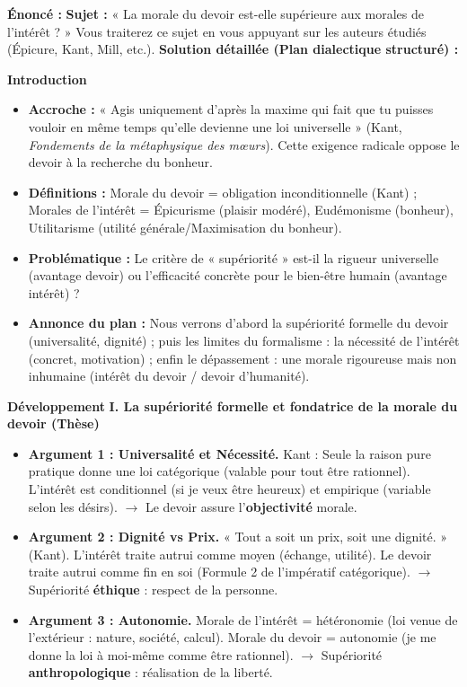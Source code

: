 \documentclass[11pt]{article}
\newcommand{\cle}[1]{{\popxbold\color{popdark}#1}}
\begin{document}
\begin{exoresolu}
\textbf{Énoncé :} \textbf{Sujet :} « La morale du devoir est-elle supérieure aux morales de l'intérêt ? » Vous traiterez ce sujet en vous appuyant sur les auteurs étudiés (Épicure, Kant, Mill, etc.).
\tcblower
\textbf{Solution détaillée (Plan dialectique structuré) :}

\textbf{Introduction}
\begin{itemize}
    \item \textbf{Accroche :} « Agis uniquement d'après la maxime qui fait que tu puisses vouloir en même temps qu'elle devienne une loi universelle » (Kant, \emph{Fondements de la métaphysique des mœurs}). Cette exigence radicale oppose le devoir à la recherche du bonheur.
    \item \textbf{Définitions :} Morale du devoir = obligation inconditionnelle (Kant) ; Morales de l'intérêt = Épicurisme (plaisir modéré), Eudémonisme (bonheur), Utilitarisme (utilité générale/Maximisation du bonheur).
    \item \textbf{Problématique :} Le critère de « supériorité » est-il la \cle{rigueur universelle} (avantage devoir) ou l'\cle{efficacité concrète} pour le bien-être humain (avantage intérêt) ?
    \item \textbf{Annonce du plan :} Nous verrons d'abord la supériorité formelle du devoir (universalité, dignité) ; puis les limites du formalisme : la nécessité de l'intérêt (concret, motivation) ; enfin le dépassement : une morale rigoureuse mais non inhumaine (intérêt du devoir / devoir d'humanité).
\end{itemize}

\textbf{Développement}
\textbf{I. La supériorité formelle et fondatrice de la morale du devoir (Thèse)}
\begin{itemize}
    \item \textbf{Argument 1 : Universalité et Nécessité.} Kant : Seule la raison pure pratique donne une loi \cle{catégorique} (valable pour tout être rationnel). L'intérêt est \cle{conditionnel} (si je veux être heureux) et \cle{empirique} (variable selon les désirs). $\rightarrow$ Le devoir assure l'\textbf{objectivité} morale.
    \item \textbf{Argument 2 : Dignité vs Prix.} « Tout a soit un prix, soit une dignité. » (Kant). L'intérêt traite autrui comme \cle{moyen} (échange, utilité). Le devoir traite autrui comme \cle{fin en soi} (Formule 2 de l'impératif catégorique). $\rightarrow$ Supériorité \textbf{éthique} : respect de la personne.
    \item \textbf{Argument 3 : Autonomie.} Morale de l'intérêt = \cle{hétéronomie} (loi venue de l'extérieur : nature, société, calcul). Morale du devoir = \cle{autonomie} (je me donne la loi à moi-même comme être rationnel). $\rightarrow$ Supériorité \textbf{anthropologique} : réalisation de la liberté.
\end{itemize}


\end{exoresolu}
\end{document}
